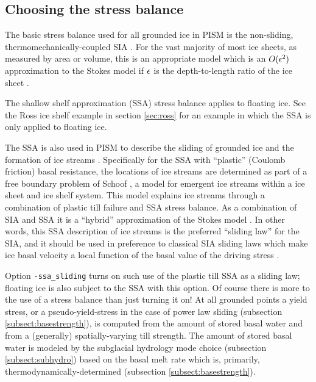 \clearpage

\subsection{Choosing the stress balance}  \label{subsect:ssacontrol}

The basic stress balance used for all grounded ice in PISM is the non-sliding, thermomechanically-coupled SIA \cite{BBL}.  For the vast majority of most ice sheets, as measured by area or volume, this is an appropriate model which is an $O(\epsilon^2)$ approximation to the Stokes model if $\epsilon$ is the depth-to-length ratio of the ice sheet \cite{Fowler}.

The shallow shelf approximation (SSA) stress balance applies to floating ice.  See the Ross ice shelf example in section \ref{sec:ross} for an example in which the SSA is only applied to floating ice.

The SSA is also used in PISM to describe the sliding of grounded ice and the formation of ice streams \cite{BBssasliding}.  Specifically for the SSA with ``plastic'' (Coulomb friction) basal resistance, the locations of ice streams are determined as part of a free boundary problem of Schoof \cite{SchoofStream}, a model for emergent ice streams within a ice sheet and ice shelf system.  This model explains ice streams through a combination of plastic till failure and SSA stress balance.  As a combination of SIA and SSA it is a ``hybrid'' approximation of the Stokes model \cite{BBssasliding,Winkelmannetal2011}.  In other words, this SSA description of ice streams is the preferred ``sliding law'' for the SIA, and it should be used in preference to classical SIA sliding laws which make ice basal velocity a local function of the basal value of the driving stress \cite{BBssasliding}.

Option \texttt{-ssa_sliding} turns on such use of the plastic till SSA as a sliding law; floating ice is also subject to the SSA with this option.  Of course there is more to the use of a stress balance than just turning it on!  At all grounded points a yield stress, or a pseudo-yield-stress in the case of power law sliding (subsection \ref{subsect:basestrength}), is computed from the amount of stored basal water and from a (generally) spatially-varying till strength.  The amount of stored basal water is modeled by the subglacial hydrology mode choice (subsection \ref{subsect:subhydro}) based on the basal melt rate which is, primarily, thermodynamically-determined (subsection \ref{subsect:basestrength}).


